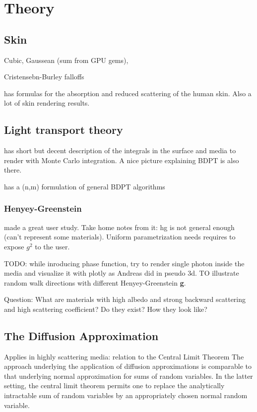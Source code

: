 \chapter{Theory}
\label{chapter:Theory}

\section{Skin}

Cubic, Gaussean (sum from GPU gems),

Cristensebn-Burley falloffs 

\cite{EGWR:EGSR06:409-417} has formulas for the absorption and reduced scattering of the human skin. Also a lot of skin rendering results.

\section{Light transport theory}
\cite{Lafortune:1996:RPM:275458.275468} has short but decent description of the
integrals in the surface and media to render with Monte Carlo integration.
A nice picture explaining BDPT is also there.

\cite{Veach:94:BDPT} has a (n,m) formulation of general BDPT algorithms

\subsection{Henyey-Greenstein}
\cite{Gkioulekas:2013:IVR:2508363.2508377} made a great user study.
Take home notes from it: \gls{hg} is not general enough (can't represent some
materials). Uniform parametrization needs requires to expose $g^2$ to the user.

TODO: while inroducing phase function, try to render single photon inside the
media and visualize it with plotly as Andreas did in pseudo 3d. TO illustrate
random walk directions with different Henyey-Greenstein \textbf{g}.

Question: What are materials with high albedo and strong backward scattering
and high scattering coefficient? Do they exist? How they look like?

\section{The Diffusion Approximation}
Applies in highly scattering media: relation to the Central Limit Theorem
The approach underlying the application of diffusion approximations is comparable to that underlying normal approximation for
sums of random variables. In the latter setting, the central limit theorem
permits one to replace the analytically intractable sum of random variables by
an appropriately chosen normal random variable.

